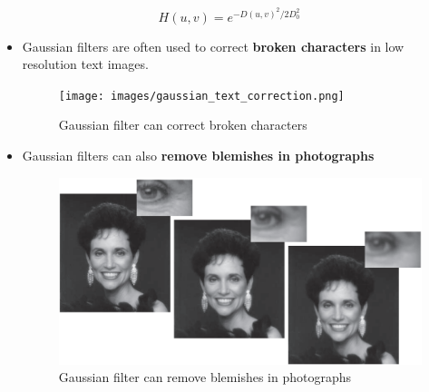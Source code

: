 \begin{itemize}
\begin{itemize}
        \begin{equation*}
          H(u, v) = e^{-D(u, v)^2/2D_0^2}
        \end{equation*}

        \begin{itemize}
          \item Gaussian filters are often used to correct \textbf{broken
            characters} in low resolution text images.

            \begin{minipage}{\linewidth}
              \vspace{-0.5cm}
              \begin{figure}[H]
                \centering
                \texttt{[image: images/gaussian\_text\_correction.png]}
                \caption{Gaussian filter can correct broken characters}
              \end{figure}
            \end{minipage}

          \item Gaussian filters can also \textbf{remove blemishes in
            photographs}

            \begin{minipage}{\linewidth}
              \vspace{-0.4cm}
              \begin{figure}[H]
                \centering
                \includegraphics[width=\linewidth]{images/gaussian_photo_correction.png}
                \caption{Gaussian filter can remove blemishes in photographs}
              \end{figure}
            \end{minipage}
        \end{itemize}
    \end{itemize}


\end{itemize}
